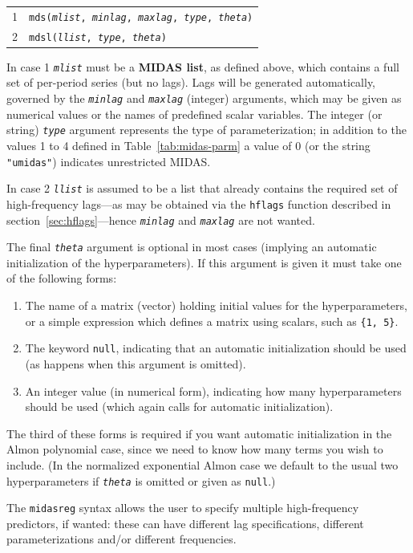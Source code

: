 \documentclass{article}
\begin{document}
\begin{tabular}{ll}
1 & \texttt{mds(\textsl{mlist}, \textsl{minlag}, 
   \textsl{maxlag}, \textsl{type}, \textsl{theta})} \\
2 & \texttt{mdsl(\textsl{llist}, \textsl{type}, \textsl{theta})}
\end{tabular}

In case 1 \texttt{\textsl{mlist}} must be a \textbf{MIDAS list}, as
defined above, which contains a full set of per-period series (but no
lags). Lags will be generated automatically, governed by the
\texttt{\textsl{minlag}} and \texttt{\textsl{maxlag}} (integer)
arguments, which may be given as numerical values or the names of
predefined scalar variables. The integer (or string)
\texttt{\textsl{type}} argument represents the type of
parameterization; in addition to the values 1 to 4 defined in
Table~\ref{tab:midas-parm} a value of 0 (or the string
\verb|"umidas"|) indicates unrestricted MIDAS.

In case 2 \texttt{\textsl{llist}} is assumed to be a list that
already contains the required set of high-frequency lags---as may be
obtained via the \texttt{hflags} function described in
section~\ref{sec:hflags}---hence \texttt{\textsl{minlag}} and
\texttt{\textsl{maxlag}} are not wanted.

The final \texttt{\textsl{theta}} argument is optional in most cases
(implying an automatic initialization of the hyperparameters). If this
argument is given it must take one of the following forms:
\begin{enumerate}
\item The name of a matrix (vector) holding initial values for the
  hyperparameters, or a simple expression which defines a matrix
  using scalars, such as \texttt{\{1, 5\}}.
\item The keyword \texttt{null}, indicating that an automatic
  initialization should be used (as happens when this argument is
  omitted).
\item An integer value (in numerical form), indicating how many
  hyperparameters should be used (which again calls for
  automatic initialization).
\end{enumerate}
The third of these forms is required if you want automatic
initialization in the Almon polynomial case, since we need to know how
many terms you wish to include. (In the normalized exponential Almon
case we default to the usual two hyperparameters if
\texttt{\textsl{theta}} is omitted or given as \texttt{null}.)

The \texttt{midasreg} syntax allows the user to specify multiple
high-frequency predictors, if wanted: these can have different lag
specifications, different parameterizations and/or different
frequencies.
\end{document}

